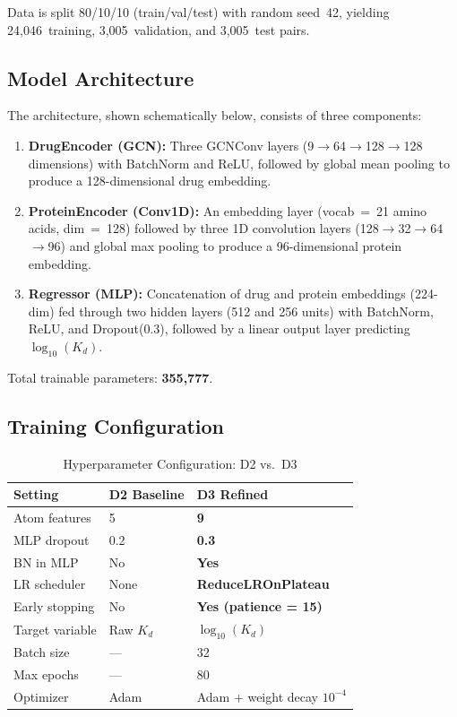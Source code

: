 \documentclass[conference]{IEEEtran}
\begin{document}
Data is split 80/10/10 (train/val/test) with random seed~42, yielding
24,046~training, 3,005~validation, and 3,005~test pairs.

\subsection{Model Architecture}

The architecture, shown schematically below, consists of three components:

\begin{enumerate}
  \item \textbf{DrugEncoder (GCN):} Three GCNConv layers (9$\to$64$\to$128$\to$128
        dimensions) with BatchNorm and ReLU, followed by global mean pooling to
        produce a 128-dimensional drug embedding.
  \item \textbf{ProteinEncoder (Conv1D):} An embedding layer (vocab~=~21
        amino acids, dim~=~128) followed by three 1D convolution layers
        (128$\to$32$\to$64$\to$96) and global max pooling to produce a
        96-dimensional protein embedding.
  \item \textbf{Regressor (MLP):} Concatenation of drug and protein embeddings
        (224-dim) fed through two hidden layers (512 and 256 units) with
        BatchNorm, ReLU, and Dropout(0.3), followed by a linear output layer
        predicting $\log_{10}(K_d)$.
\end{enumerate}

Total trainable parameters: \textbf{355,777}.

\subsection{Training Configuration}

\begin{table}[h]
\centering
\caption{Hyperparameter Configuration: D2 vs.\ D3}
\label{tab:hyperparam}
\begin{tabular}{lll}
\toprule
\textbf{Setting} & \textbf{D2 Baseline} & \textbf{D3 Refined} \\
\midrule
Atom features       & 5            & \textbf{9}                     \\
MLP dropout         & 0.2          & \textbf{0.3}                   \\
BN in MLP           & No           & \textbf{Yes}                   \\
LR scheduler        & None         & \textbf{ReduceLROnPlateau}     \\
Early stopping      & No           & \textbf{Yes (patience = 15)}   \\
Target variable     & Raw $K_d$    & \textbf{$\log_{10}(K_d)$}      \\
Batch size          & ---          & 32                             \\
Max epochs          & ---          & 80                             \\
Optimizer           & Adam         & Adam + weight decay $10^{-4}$  \\
\bottomrule
\end{tabular}
\end{table}
\end{document}
